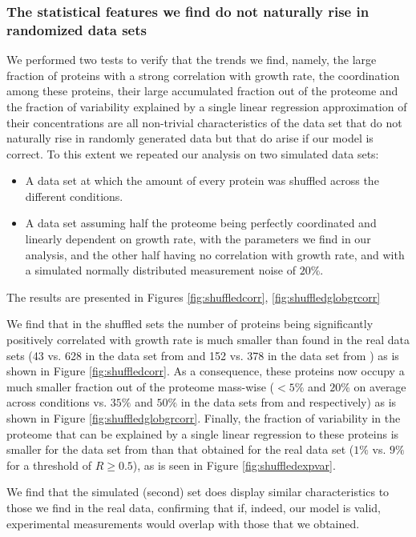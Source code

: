 \subsubsection{The statistical features we find do not naturally rise in randomized data sets}
We performed two tests to verify that the trends we find, namely, the large fraction of proteins with a strong correlation with growth rate, the coordination among these proteins, their large accumulated fraction out of the proteome and the fraction of variability explained by a single linear regression approximation of their concentrations are all non-trivial characteristics of the data set that do not naturally rise in randomly generated data but that do arise if our model is correct.
To this extent we repeated our analysis on two simulated data sets:
\begin{itemize}
\item A data set at which the amount of every protein was shuffled across the different conditions.
\item A data set assuming half the proteome being perfectly coordinated and linearly dependent on growth rate, with the parameters we find in our analysis, and the other half having no correlation with growth rate, and with a simulated normally distributed measurement noise of $20\%$.
\end{itemize}
The results are presented in Figures \ref{fig:shuffledcorr}, \ref{fig:shuffledglobgrcorr}

We find that in the shuffled sets the number of proteins being significantly positively correlated with
growth rate is much smaller than found in the real data sets (43 vs. 628 in the data set from \cite{Heinemann2015} and 152 vs. 378 in the data set from \cite{Valgepea2013}) as is shown in Figure \ref{fig:shuffledcorr}.
As a consequence, these proteins now occupy a much smaller fraction out of the proteome mass-wise ($<5\%$ and $20\%$ on average across conditions vs. $35\%$ and $50\%$ in the data sets from \cite{Heinemann2015} and \cite{Valgepea2013} respectively) as is shown in Figure \ref{fig:shuffledglobgrcorr}.
Finally, the fraction of variability in the proteome that can be explained by a single linear regression to these proteins is smaller for the data set from \cite{Heinemann2015} than that obtained for the real data set ($1\%$ vs. $9\%$ for a threshold of $R\ge0.5$), as is seen in Figure \ref{fig:shuffledexpvar}.

We find that the simulated (second) set does display similar characteristics to those we find in the real data, confirming that if, indeed, our model is valid, experimental measurements would overlap with those that we obtained.